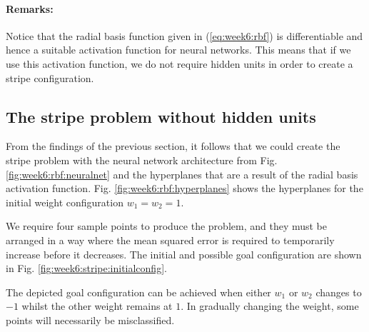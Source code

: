 \documentclass{article}
\begin{document}
\paragraph{Remarks:}
Notice that the radial basis function given in (\ref{eq:week6:rbf}) is differentiable and hence a suitable activation function for neural networks.
This means that if we use this activation function, we do not require hidden units in order to create a stripe configuration.

\subsection{The stripe problem without hidden units}
\label{sec:week6:stripe}
From the findings of the previous section, it follows that we could create the stripe problem with the neural network architecture from Fig. \ref{fig:week6:rbf:neuralnet} and the hyperplanes that are a result of the radial basis activation function.
Fig. \ref{fig:week6:rbf:hyperplanes} shows the hyperplanes for the initial weight configuration $w_1=w_2=1$.

We require four sample points to produce the problem, and they must be arranged in a way where the mean squared error is required to temporarily increase before it decreases.
The initial and possible goal configuration are shown in Fig. \ref{fig:week6:stripe:initialconfig}.

The depicted goal configuration can be achieved when either $w_1$ or $w_2$ changes to $-1$ whilst the other weight remains at $1$. In gradually changing the weight, some points will necessarily be misclassified. 
\end{document}
